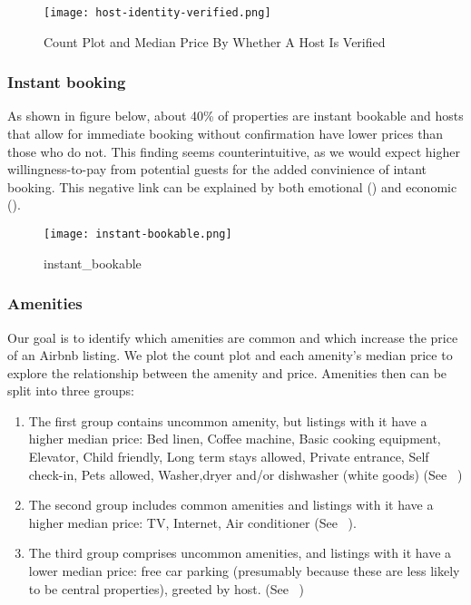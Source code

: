 \begin{figure}[!htbp]\centering
    \texttt{[image: host-identity-verified.png]}
    \caption{Count Plot and Median Price By Whether A Host Is Verified}
    \label{fig:host_identity_verified}
\end{figure}

\subsubsection*{Instant booking}

As shown in figure below, about 40\% of properties are instant bookable and
hosts that allow for immediate booking without confirmation  have lower prices
than those who do not. This finding seems counterintuitive, as we would expect
higher willingness-to-pay from potential guests for the added convinience of
intant booking.  This negative link can be explained by both emotional
(\textcite{wang2017price}) and economic (\textcite{benitez2018flexible}).

\begin{figure}[!htbp]
    \centering
    \texttt{[image: instant-bookable.png]}
    \caption{instant\_bookable}
    \label{fig:instant_bookable}
\end{figure}

\subsubsection*{Amenities}

Our goal is to identify which amenities are common and which increase the price
of an Airbnb listing. We plot the count plot and each amenity's
median price to explore the relationship between the amenity and price.
Amenities then can be split into three groups:

\begin{enumerate}

  \item The first group contains uncommon amenity, but listings with it have a
    higher median price: Bed linen, Coffee machine, Basic cooking equipment,
    Elevator, Child friendly, Long term stays allowed, Private entrance, Self
    check-in, Pets allowed, Washer,dryer and/or dishwasher (white goods)
    (See
    ~)

  \item The second group includes common amenities and listings with it have a
      higher median price: TV, Internet, Air conditioner (See
      ~).

  \item The third group comprises uncommon amenities, and listings with it have
      a lower median price:  free car parking (presumably because these are less
      likely to be central properties), greeted by host. (See
      ~)

\end{enumerate}

